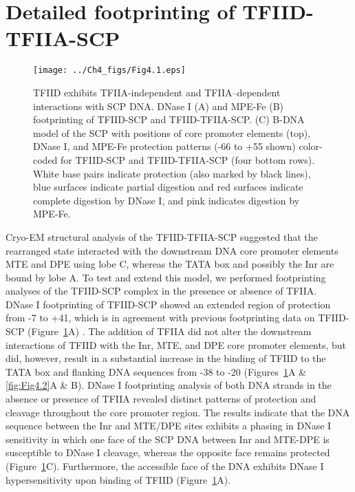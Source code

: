 \section{Detailed footprinting of TFIID-TFIIA-SCP}
\begin{figure}
\centering
\texttt{[image: ../Ch4\_figs/Fig4.1.eps]}
\caption[TFIID exhibits TFIIA-independent and TFIIA-dependent interactions with SCP DNA]{TFIID exhibits TFIIA-independent and TFIIA–dependent interactions with SCP DNA. DNase I (A) and MPE-Fe (B) footprinting of TFIID-SCP and TFIID-TFIIA-SCP. (C) B-DNA model of the SCP with positions of core promoter elements (top), DNase I, and MPE-Fe protection patterns (-66 to +55 shown) color-coded for TFIID-SCP and TFIID-TFIIA-SCP (four bottom rows).  White base pairs indicate protection (also marked by black lines), blue surfaces indicate partial digestion and red surfaces indicate complete digestion by DNase I, and pink indicates digestion by MPE-Fe.}
\label{fig:Fig4.1}
\end{figure}
Cryo-EM structural analysis of the TFIID-TFIIA-SCP suggested that the rearranged state interacted with the downstream DNA core promoter elements MTE and DPE using lobe C, whereas the TATA box and possibly the Inr are bound by lobe A. To test and extend this model, we performed footprinting analyses of the TFIID-SCP complex in the presence or absence of TFIIA.\\
\indent DNase I footprinting of TFIID-SCP showed an extended region of protection from -7 to +41, which is in agreement with previous footprinting data on TFIID-SCP (Figure~\ref{fig:Fig4.1}A) \cite{Juven-Gershon_1249}. The addition of TFIIA did not alter the downstream interactions of TFIID with the Inr, MTE, and DPE core promoter elements, but did, however, result in a substantial increase in the binding of TFIID to the TATA box and flanking DNA sequences from -38 to -20 (Figures~\ref{fig:Fig4.1}A \& \ref{fig:Fig4.2}A \& B). DNase I footprinting analysis of both DNA strands in the absence or presence of TFIIA revealed distinct patterns of protection and cleavage throughout the core promoter region. The results indicate that the DNA sequence between the Inr and MTE/DPE sites exhibits a phasing in DNase I sensitivity in which one face of the SCP DNA between Inr and MTE-DPE is susceptible to DNase I cleavage, whereas the opposite face remains protected (Figure~\ref{fig:Fig4.1}C). Furthermore, the accessible face of the DNA exhibits DNase I hypersensitivity upon binding of TFIID (Figure~\ref{fig:Fig4.1}A). \\
